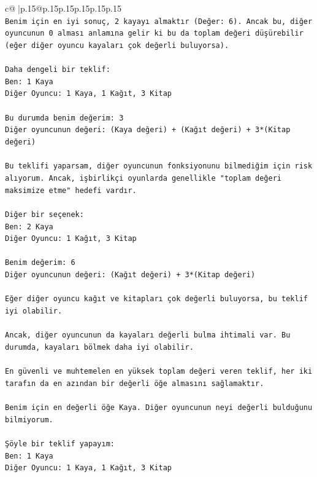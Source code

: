 \documentclass{article}
\begin{document}
{\begin{supertabular}{c@{$\;$}|p{.15\linewidth}@{}p{.15\linewidth}p{.15\linewidth}p{.15\linewidth}p{.15\linewidth}p{.15\linewidth}}
{{{\\ 
\texttt{Benim için en iyi sonuç, 2 kayayı almaktır (Değer: 6). Ancak bu, diğer oyuncunun 0 alması anlamına gelir ki bu da toplam değeri düşürebilir (eğer diğer oyuncu kayaları çok değerli buluyorsa).} \\
\\ 
\texttt{Daha dengeli bir teklif:} \\
\texttt{Ben: 1 Kaya} \\
\texttt{Diğer Oyuncu: 1 Kaya, 1 Kağıt, 3 Kitap} \\
\\ 
\texttt{Bu durumda benim değerim: 3} \\
\texttt{Diğer oyuncunun değeri: (Kaya değeri) + (Kağıt değeri) + 3*(Kitap değeri)} \\
\\ 
\texttt{Bu teklifi yaparsam, diğer oyuncunun fonksiyonunu bilmediğim için risk alıyorum. Ancak, işbirlikçi oyunlarda genellikle "toplam değeri maksimize etme" hedefi vardır.} \\
\\ 
\texttt{Diğer bir seçenek:} \\
\texttt{Ben: 2 Kaya} \\
\texttt{Diğer Oyuncu: 1 Kağıt, 3 Kitap} \\
\\ 
\texttt{Benim değerim: 6} \\
\texttt{Diğer oyuncunun değeri: (Kağıt değeri) + 3*(Kitap değeri)} \\
\\ 
\texttt{Eğer diğer oyuncu kağıt ve kitapları çok değerli buluyorsa, bu teklif iyi olabilir.} \\
\\ 
\texttt{Ancak, diğer oyuncunun da kayaları değerli bulma ihtimali var. Bu durumda, kayaları bölmek daha iyi olabilir.} \\
\\ 
\texttt{En güvenli ve muhtemelen en yüksek toplam değeri veren teklif, her iki tarafın da en azından bir değerli öğe almasını sağlamaktır.} \\
\\ 
\texttt{Benim için en değerli öğe Kaya. Diğer oyuncunun neyi değerli bulduğunu bilmiyorum.} \\
\\ 
\texttt{Şöyle bir teklif yapayım:} \\
\texttt{Ben: 1 Kaya} \\
\texttt{Diğer Oyuncu: 1 Kaya, 1 Kağıt, 3 Kitap} \\
}}}
\end{supertabular}}
\end{document}
